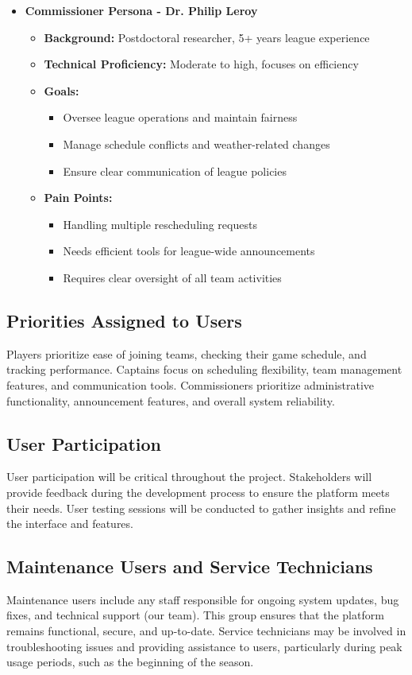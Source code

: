 \documentclass[12pt, titlepage]{article}
\begin{document}
\begin{itemize}
    \item \textbf{Commissioner Persona - Dr. Philip Leroy}
    \begin{itemize}
        \item \textbf{Background:} Postdoctoral researcher, 5+ years league experience
        \item \textbf{Technical Proficiency:} Moderate to high, focuses on efficiency
        \item \textbf{Goals:}
        \begin{itemize}
            \item Oversee league operations and maintain fairness
            \item Manage schedule conflicts and weather-related changes
            \item Ensure clear communication of league policies
        \end{itemize}
        \item \textbf{Pain Points:}
        \begin{itemize}
            \item Handling multiple rescheduling requests
            \item Needs efficient tools for league-wide announcements
            \item Requires clear oversight of all team activities
        \end{itemize}
    \end{itemize}
\end{itemize}
\subsection{Priorities Assigned to Users}
Players prioritize ease of joining teams, checking their game schedule, and tracking performance.
Captains focus on scheduling flexibility, team management features, and communication tools.
Commissioners prioritize administrative functionality, announcement features, and overall system reliability.
\subsection{User Participation}
User participation will be critical throughout the project. Stakeholders will provide feedback during the development process to ensure the platform meets their needs. User testing sessions will be conducted to gather insights and refine the interface and features.
\subsection{Maintenance Users and Service Technicians}
Maintenance users include any staff responsible for ongoing system updates, bug fixes, and technical support (our team). This group ensures that the platform remains functional, secure, and up-to-date. Service technicians may be involved in troubleshooting issues and providing assistance to users, particularly during peak usage periods, such as the beginning of the season.
\end{document}
